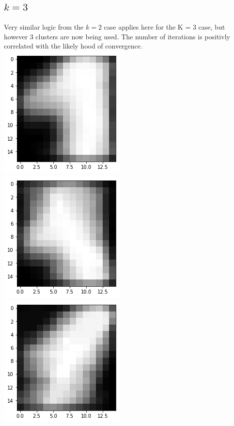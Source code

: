 \documentclass{article}
\begin{document}
\subsection{$k = 3$}
Very similar logic from the $ k = 2 $ case applies here for the K = 3 case, but however 3 clusters are now being used. The number of iterations is positivly correlated with the likely hood of convergence. \\
\includegraphics{k_3_1.png} \\
\includegraphics{k_3_2.png}\\
\includegraphics{k_3_3.png}\\
\end{document}
